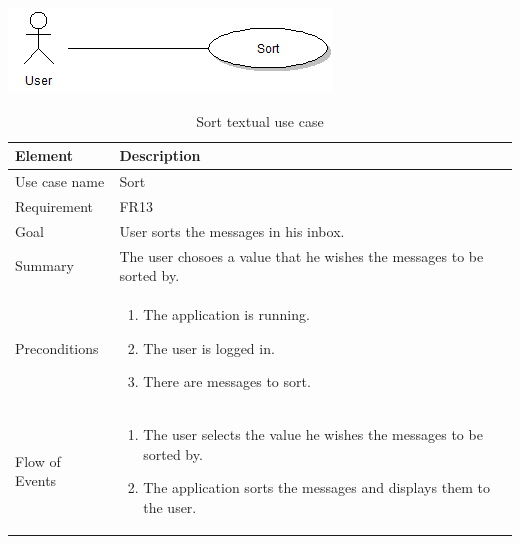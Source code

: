 \begin{table}
\begin{center}
\begin{center}
\includegraphics[width=\textwidth]{sort}
\end{center}
\begin{tabular}{p{3cm}|p{12cm}} \hline
\textbf{Element} & \textbf{Description} \\ \hline \hline
Use case name & Sort \\
Requirement & FR13 \\
Goal & User sorts the messages in his inbox. \\
Summary & The user chosoes a value that he wishes the messages to be sorted by. \\
Preconditions &
\begin{enumerate}
\item{}The application is running.
\item{}The user is logged in.
\item{}There are messages to sort.
\end{enumerate} \\ \hline
Flow of Events &
\begin{enumerate}
\item{}The user selects the value he wishes the messages to be sorted by.
\item{}The application sorts the messages and displays them to the user.
\end{enumerate} \\ \hline
\end{tabular}
\end{center}
\caption{Sort textual use case} \label{tab:search}
\end{table}

